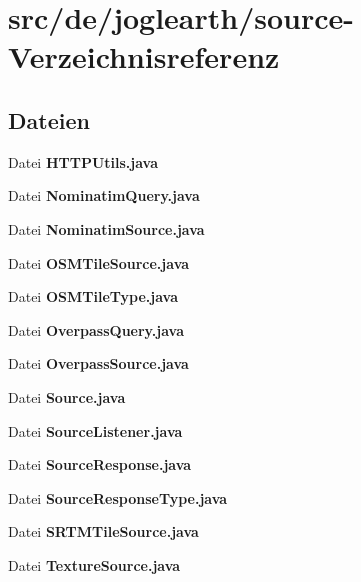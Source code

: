 \section{src/de/joglearth/source-\/\-Verzeichnisreferenz}
\label{dir_2adf1bc516f63e89372cf4e59d3c4e49}
\subsection*{Dateien}
\begin{DoxyCompactItemize}
\item 
Datei {\bfseries H\-T\-T\-P\-Utils.\-java}
\item 
Datei {\bfseries Nominatim\-Query.\-java}
\item 
Datei {\bfseries Nominatim\-Source.\-java}
\item 
Datei {\bfseries O\-S\-M\-Tile\-Source.\-java}
\item 
Datei {\bfseries O\-S\-M\-Tile\-Type.\-java}
\item 
Datei {\bfseries Overpass\-Query.\-java}
\item 
Datei {\bfseries Overpass\-Source.\-java}
\item 
Datei {\bfseries Source.\-java}
\item 
Datei {\bfseries Source\-Listener.\-java}
\item 
Datei {\bfseries Source\-Response.\-java}
\item 
Datei {\bfseries Source\-Response\-Type.\-java}
\item 
Datei {\bfseries S\-R\-T\-M\-Tile\-Source.\-java}
\item 
Datei {\bfseries Texture\-Source.\-java}
\end{DoxyCompactItemize}
